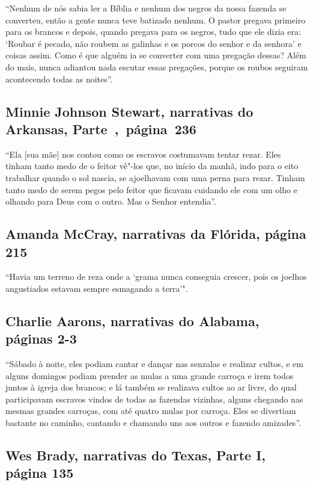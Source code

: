 ``Nenhum de nós sabia ler a Bíblia e nenhum dos negros da nossa fazenda
se converteu, então a gente nunca teve batizado nenhum. O pastor pregava
primeiro para os brancos e depois, quando pregava para os negros, tudo
que ele dizia era: `Roubar é pecado, não roubem as galinhas e os porcos
do senhor e da senhora' e coisas assim. Como é que alguém ia se
converter com uma pregação dessas? Além do mais, nunca adiantou nada
escutar essas pregações, porque os roubos seguiram acontecendo todas as
noites''.

\subsection{Minnie Johnson Stewart, narrativas do Arkansas, Parte~,~página~236}
\label{ref253} 

``Ela {[}sua mãe{]} nos contou como os escravos costumavam tentar rezar.
Eles tinham tanto medo de o feitor vê"-los que, no início da manhã, indo
para o eito trabalhar quando o sol nascia, se ajoelhavam com uma perna
para rezar. Tinham tanto medo de serem pegos pelo feitor que ficavam
cuidando ele com um olho e olhando para Deus com o outro. Mas o Senhor
entendia''.

\subsection{Amanda McCray, narrativas da Flórida, página 215}
\label{ref185}

``Havia um terreno de reza onde a `grama nunca conseguia crescer, pois
os joelhos angustiados estavam sempre esmagando a terra'".

\subsection{Charlie Aarons, narrativas do Alabama, páginas 2-3} \label{ref02}

``Sábado à noite, eles podiam cantar e dançar nas senzalas e realizar
cultos, e em alguns domingos podiam prender as mulas a uma grande
carroça e irem todos juntos à igreja dos brancos; e lá também se
realizava cultos ao ar livre, do qual participavam escravos vindos de
todas as fazendas vizinhas, alguns chegando nas mesmas grandes carroças,
com até quatro mulas por carroça. Eles se divertiam bastante no caminho,
cantando e chamando uns aos outros e fazendo amizades''.

\subsection{Wes Brady, narrativas do Texas, Parte I, página 135} \label{ref32}

